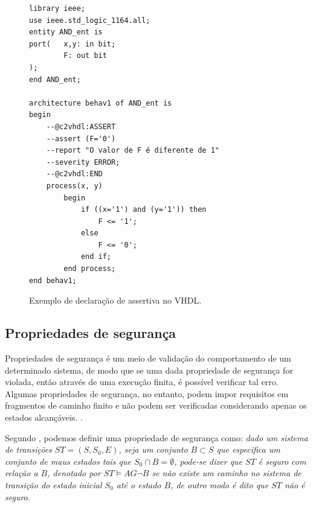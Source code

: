 \begin{figure}[H]
\caption{\label{fig:assertiva_abv} Exemplo de declaração de assertiva no VHDL.}
	\begin{center}
    \begin{minipage}{0.9\textwidth}
    \begin{lstlisting}       
library ieee;
use ieee.std_logic_1164.all;
entity AND_ent is
port(   x,y: in bit;
        F: out bit
);
end AND_ent;

architecture behav1 of AND_ent is
begin
	--@c2vhdl:ASSERT
    --assert (F='0')
    --report "O valor de F é diferente de 1"
    --severity ERROR;
    --@c2vhdl:END
	process(x, y)
    	begin
        	if ((x='1') and (y='1')) then
            	F <= '1';
        	else
            	F <= '0';
        	end if;
    	end process;
end behav1;

\end{lstlisting}
    \end{minipage}
	\end{center}
\end{figure}

\subsection{Propriedades de segurança}

Propriedades de segurança é um meio de validação do comportamento de um determinado sistema, de modo que se uma dada propriedade de segurança for violada, então através de uma execução finita, é possível verificar tal erro. Algumas propriedades de segurança, no entanto, podem impor requisitos em fragmentos de caminho finito e não podem ser verificadas considerando apenas os estados alcançáveis. \cite{baier2008principles}.

\par
Segundo \cite{clarke2003verification}, podemos definir uma propriedade de segurança como: \textit{dado um sistema de transições $ST = (S, S_0, E)$, seja um conjunto $B \subset S$ que especifica um conjunto de maus estados tais que $S_0 \cap B = \emptyset$, pode-se dizer que $ST$ é seguro com relação a $B$, denotado por $ST \models AG\neg B$ se não existe um caminho no sistema de transição do estado inicial $S_0$ até o estado $B$, de outro modo é dito que $ST$ não é seguro}.

